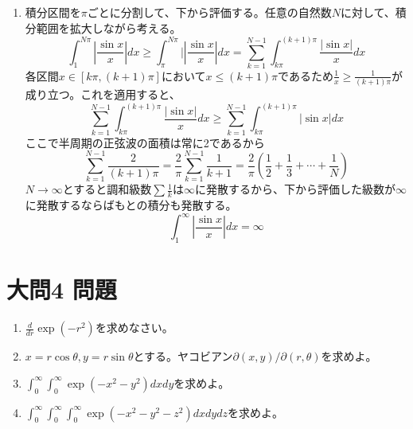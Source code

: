 \documentclass[dvipdfmx]{jsreport}
\begin{document}
\begin{souanswer}
\begin{enumerate}
\begin{equation*}
	\int_a^\infty \frac{\sin{x}}{x}dx= -\int_1^\infty \frac{\cos{x}}{x^2}dx+ \cos{1}
\end{equation*}
	両辺の絶対値をとり、三角不等式を適用すると、
\begin{equation*}
	\left|\int_a^\infty \frac{\sin{x}}{x}dx\right|\le \left|-\int_1^\infty \frac{\cos{x}}{x^2}dx\right|+ |\cos{1}|
\end{equation*}
	\ref{R8_3rd_3(3)}の結果より$\left|\int_1^\infty \frac{\cos{x}}{x}dx\right|\le 1$であり、$\cos{1}$は有限の値であるから
\begin{equation*}
	\left|\int_1^\infty \frac{\sin{x}}{x}dx\right|\le 1+ |\cos{x}|< \infty
\end{equation*}
	\item 積分区間を$\pi$ごとに分割して、下から評価する。任意の自然数$N$に対して、積分範囲を拡大しながら考える。
\begin{equation*}
	\int_1^{N\pi} \left|\frac{\sin{x}}{x}\right|dx\ge \int_\pi^{N\pi}|\left|\frac{\sin{x}}{x}\right|dx= \sum_{k= 1}^{N- 1}\int_{k\pi}^{(k+ 1)\pi} \frac{|\sin{x}|}{x}dx
\end{equation*}
	各区間$x\in [k\pi, (k+ 1)\pi]$において$x\le (k+ 1)\pi$であるため$\frac{1}{x}\ge \frac{1}{(k+ 1)\pi}$が成り立つ。これを適用すると、
\begin{equation*}
	\sum_{k= 1}^{N- 1}\int_{k\pi}^{(k+ 1)\pi}\frac{|\sin{x}|}{x}dx\ge \sum_{k= 1}^{N- 1} \int_{k\pi}^{(k+ 1)\pi}|\sin{x}|dx
\end{equation*}
	ここで半周期の正弦波の面積は常に2であるから
\begin{equation*}
	\sum_{k= 1}^{N- 1}\frac{2}{(k+ 1)\pi}= \frac{2}{\pi}\sum_{k= 1}^{N- 1} \frac{1}{k+ 1}= \frac{2}{\pi}\left(\frac{1}{2}+ \frac{1}{3}+ \cdots+ \frac{1}{N}\right)
\end{equation*}
	$N\to \infty$とすると調和級数$\sum \frac{1}{k}$は$\infty$に発散するから、下から評価した級数が$\infty$に発散するならばもとの積分も発散する。
\begin{equation*}
	\int_1^\infty \left|\frac{\sin{x}}{x}\right|dx= \infty
\end{equation*}
\end{enumerate}
\end{souanswer}

\section{大問4 問題}
\begin{tcolorbox} %
\begin{enumerate}
	\item $\frac{d}{dr}\exp{(-r^2)}$を求めなさい。
	\item $x= r\cos{\theta}, y= r\sin{\theta}$とする。ヤコビアン${\partial(x, y)}/{\partial(r, \theta)}$を求めよ。
	\item $\int_0^\infty \int_0^\infty \exp{(-x^2- y^2)}dxdy$を求めよ。
	\item $\int_0^\infty \int_0^\infty\int_0^\infty \exp{(-x^2- y^2- z^2)}dxdydz$を求めよ。
\end{enumerate}
\end{tcolorbox}
\end{document}
